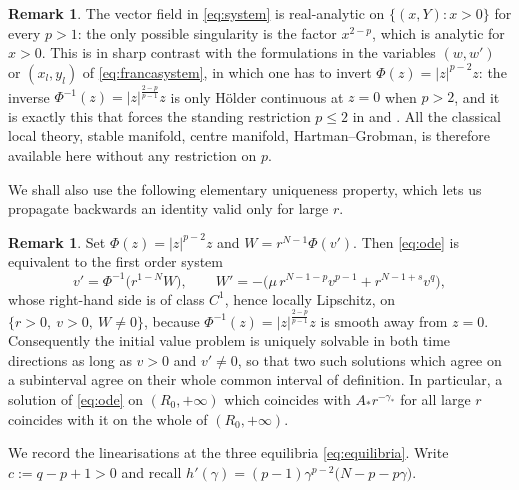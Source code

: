 \documentclass[11pt,reqno]{amsart}
\numberwithin{equation}{section}
\theoremstyle{plain}
\theoremstyle{definition}
\newtheorem{remark}[theorem]{Remark}
\newcommand{\gs}{\gamma_{*}}
\begin{document}
\begin{remark}\label{rem:analytic}
The vector field in \eqref{eq:system} is real-analytic on
$\{(x,Y):x>0\}$ for every $p>1$: the only possible singularity is the factor
$x^{2-p}$, which is analytic for $x>0$. This is in sharp contrast with the
formulations in the variables $(w,w')$ or $(x_{l},y_{l})$ of
\eqref{eq:francasystem}, in which one has to invert $\Phi(z)=|z|^{p-2}z$: the
inverse $\Phi^{-1}(z)=|z|^{\frac{2-p}{p-1}}z$ is only H\"older continuous at
$z=0$ when $p>2$, and it is exactly this that forces the standing restriction
$p\le2$ in \cite[\S2]{Franca2008} and \cite[Rem.~7]{DFS2026}. All the classical
local theory, stable manifold, centre manifold, Hartman--Grobman, is
therefore available here without any restriction on $p$.
\end{remark}

We shall also use the following elementary uniqueness property, which lets us
propagate backwards an identity valid only for large $r$.

\begin{remark}\label{rem:uniqueness}
Set $\Phi(z)=|z|^{p-2}z$ and $W=r^{N-1}\Phi(v')$. Then \eqref{eq:ode} is
equivalent to the first order system
\[
v'=\Phi^{-1}\big(r^{1-N}W\big),
\qquad
W'=-\big(\mu\,r^{N-1-p}v^{p-1}+r^{N-1+s}v^{q}\big),
\]
whose right-hand side is of class $C^{1}$, hence locally Lipschitz, on
$\{r>0,\ v>0,\ W\ne0\}$, because $\Phi^{-1}(z)=|z|^{\frac{2-p}{p-1}}z$ is
smooth away from $z=0$. Consequently the initial value problem is uniquely
solvable in both time directions as long as $v>0$ and $v'\ne0$, so that two
such solutions which agree on a subinterval agree on their whole common
interval of definition. In particular, a solution of \eqref{eq:ode} on
$(R_{0},+\infty)$ which coincides with $A_{*}r^{-\gs}$ for all large $r$
coincides with it on the whole of $(R_{0},+\infty)$.
\end{remark}

We record the linearisations at the three equilibria \eqref{eq:equilibria}.
Write $c:=q-p+1>0$ and recall
$h'(\gamma)=(p-1)\gamma^{p-2}\big(N-p-p\gamma\big)$.
\end{document}
